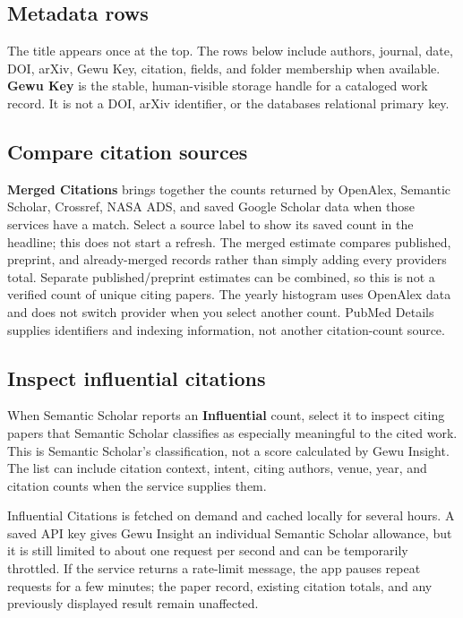 \documentclass[10pt,letterpaper,oneside]{scrreprt}
\begin{document}
\subsection{Metadata rows}\label{metadata-rows}

The title appears once at the top. The rows below include authors, journal, date, DOI, arXiv, Gewu Key, citation, fields, and folder membership when available. \textbf{Gewu Key} is the stable, human-visible storage handle for a cataloged work record. It is not a DOI, arXiv identifier, or the database\textquotesingle s relational primary key.

\subsection{Compare citation sources}\label{compare-citation-sources}

\textbf{Merged Citations} brings together the counts returned by OpenAlex, Semantic Scholar, Crossref, NASA ADS, and saved Google Scholar data when those services have a match. Select a source label to show its saved count in the headline; this does not start a refresh. The merged estimate compares published, preprint, and already-merged records rather than simply adding every provider\textquotesingle s total. Separate published/preprint estimates can be combined, so this is not a verified count of unique citing papers. The yearly histogram uses OpenAlex data and does not switch provider when you select another count. PubMed Details supplies identifiers and indexing information, not another citation-count source.

\subsection{Inspect influential citations}\label{inspect-influential-citations}

When Semantic Scholar reports an \textbf{Influential} count, select it to inspect citing papers that Semantic Scholar classifies as especially meaningful to the cited work. This is Semantic Scholar's classification, not a score calculated by Gewu Insight. The list can include citation context, intent, citing authors, venue, year, and citation counts when the service supplies them.

Influential Citations is fetched on demand and cached locally for several hours. A saved API key gives Gewu Insight an individual Semantic Scholar allowance, but it is still limited to about one request per second and can be temporarily throttled. If the service returns a rate-limit message, the app pauses repeat requests for a few minutes; the paper record, existing citation totals, and any previously displayed result remain unaffected.
\end{document}

